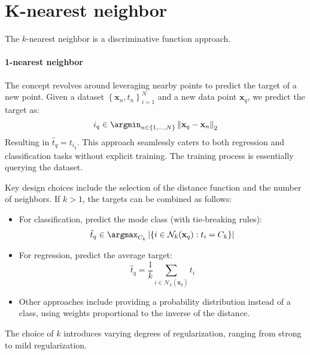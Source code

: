 \section{K-nearest neighbor}

The $k$-nearest neighbor is a discriminative function approach. 

\paragraph*{1-nearest neighbor}
The concept revolves around leveraging nearby points to predict the target of a new point.
Given a dataset $\left\{ \textbf{x}_n,t_n \right\}_{i=1}^{N}$ and a new data point $\textbf{x}_q$, we predict the target as:
\[i_q\in \argmin_{n \in \left\{ 1,\dots,N \right\}}\left\lVert \textbf{x}_q-\textbf{x}_n\right\rVert_2 \]
Resulting in $\hat{t}_q=t_{i_q}$. 
This approach seamlessly caters to both regression and classification tasks without explicit training. The training process is essentially querying the dataset.

Key design choices include the selection of the distance function and the number of neighbors. 
If $k>1$, the targets can be combined as follows:
\begin{itemize}
    \item For classification, predict the mode class (with tie-breaking rules):
        \[\hat{t}_q\in\argmax_{C_k}\left\lvert \{ i \in \mathcal{N}_k(\textbf{x}_q):t_i=C_k \}\right\rvert \]
    \item For regression, predict the average target:
        \[\hat{t}_q=\dfrac{1}{k}\sum_{i \in \mathcal{N}_k(\textbf{x}_q)}t_i\]
    \item Other approaches include providing a probability distribution instead of a class, using weights proportional to the inverse of the distance. 
\end{itemize}
The choice of $k$ introduces varying degrees of regularization, ranging from strong to mild regularization.